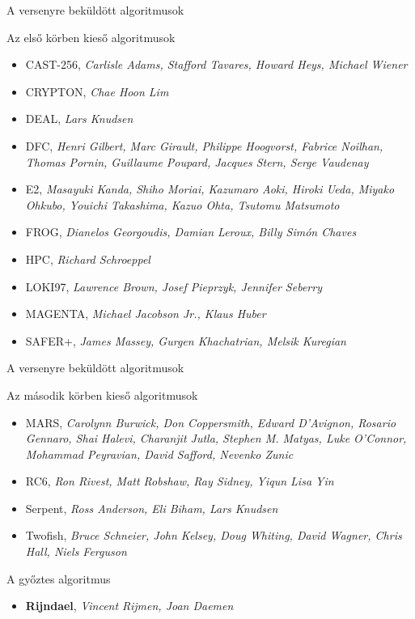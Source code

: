 \documentclass[12 pt]{beamer}
\begin{document}
\begin{frame}{A versenyre beküldött algoritmusok}
  \begin{spacing}{.9}
  \begin{block}{Az első körben kieső algoritmusok}
    \begin{itemize}
  \setlength\itemsep{0em}
      \item{CAST-256, \emph{Carlisle Adams, Stafford Tavares, Howard Heys, Michael Wiener}}
      \item{CRYPTON, \emph{Chae Hoon Lim}}
      \item{DEAL, \emph{Lars Knudsen}}
      \item{DFC, \emph{Henri Gilbert, Marc Girault, Philippe Hoogvorst, Fabrice Noilhan, Thomas Pornin, Guillaume Poupard, Jacques Stern, Serge Vaudenay}}
      \item{E2, \emph{Masayuki Kanda, Shiho Moriai, Kazumaro Aoki, Hiroki Ueda, Miyako Ohkubo, Youichi Takashima, Kazuo Ohta, Tsutomu Matsumoto}}
      \item{FROG, \emph{Dianelos Georgoudis, Damian Leroux, Billy Simón Chaves}}
      \item{HPC, \emph{Richard Schroeppel}}
      \item{LOKI97, \emph{Lawrence Brown, Josef Pieprzyk, Jennifer Seberry}}
      \item{MAGENTA, \emph{Michael Jacobson Jr., Klaus Huber}}
      \item{SAFER+, \emph{James Massey, Gurgen Khachatrian, Melsik Kuregian}}
    \end{itemize}
  \end{block}
  \end{spacing}
\end{frame}

\begin{frame}{A versenyre beküldött algoritmusok}
  \begin{block}{Az második körben kieső algoritmusok}
    \begin{itemize}
      \item{MARS, \emph{Carolynn Burwick, Don Coppersmith, Edward D'Avignon, Rosario Gennaro, Shai Halevi, Charanjit Jutla, Stephen M. Matyas, Luke O'Connor, Mohammad Peyravian, David Safford, Nevenko Zunic}}
      \item{RC6, \emph{Ron Rivest, Matt Robshaw, Ray Sidney, Yiqun Lisa Yin}}
      \item{Serpent, \emph{Ross Anderson, Eli Biham, Lars Knudsen}}
      \item{Twofish, \emph{Bruce Schneier, John Kelsey, Doug Whiting, David Wagner, Chris Hall, Niels Ferguson}}
    \end{itemize}
  \end{block}

  \begin{block}{A győztes algoritmus}
    \begin{itemize}
      \item{\textbf{Rijndael}, \emph{Vincent Rijmen, Joan Daemen}}
    \end{itemize}
  \end{block}

\end{frame}
\end{document}
